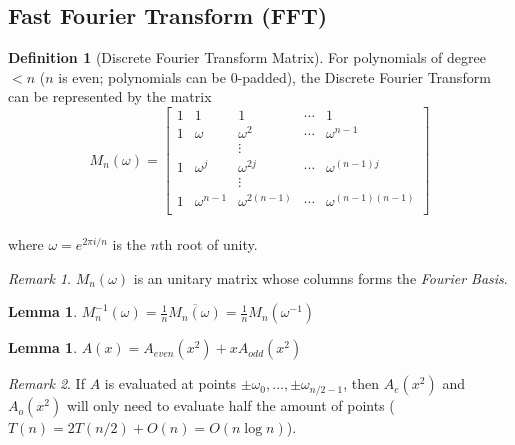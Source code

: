 \documentclass[11pt]{article}
\newtheorem{lemma}[theorem]{Lemma}
\theoremstyle{definition}
\newtheorem{definition}{Definition}[section]
\theoremstyle{remark}
\newtheorem*{remark}{Remark}
\begin{document}
\subsection{Fast Fourier Transform (FFT)}
\begin{definition}[Discrete Fourier Transform Matrix]
For polynomials of degree $<n$ ($n$ is even; polynomials can be 0-padded), the Discrete Fourier Transform can be represented by the matrix
$$M_n (\omega) = \begin{bmatrix}
1 & 1 & 1 & \cdots & 1 \\
1 & \omega & \omega^2 & \cdots & \omega^{n-1} \\
&&\vdots \\
1 & \omega^j & \omega^{2j} & \cdots & \omega^{(n-1)j} \\
&&\vdots \\
1 & \omega^{n-1} & \omega^{2(n-1)} & \cdots & \omega^{(n-1)(n-1)} \\
\end{bmatrix}$$ \\
where $\omega = e^{2\pi i / n}$ is the $n$th root of unity.
\end{definition}

\begin{remark}
$M_n (\omega)$ is an unitary matrix whose columns forms the \textit{Fourier Basis}.
\end{remark}

\begin{lemma}
$M_n^{-1} (\omega) = \frac{1}{n} \overline{M_n (\omega)} = \frac{1}{n} M_n (\omega^{-1})$
\end{lemma}

\begin{lemma} 
$A(x)=A_{even}(x^2)+xA_{odd}(x^2)$ 
\end{lemma}

\begin{remark}
If $A$ is evaluated at points $\pm \omega_0,\dots, \pm \omega_{n/2-1}$, then $A_e(x^2)$ and $A_o(x^2)$ will only need to evaluate half the amount of points ($T(n) = 2T(n/2) + O(n) = O(n \log n)$).
\end{remark}
\end{document}
